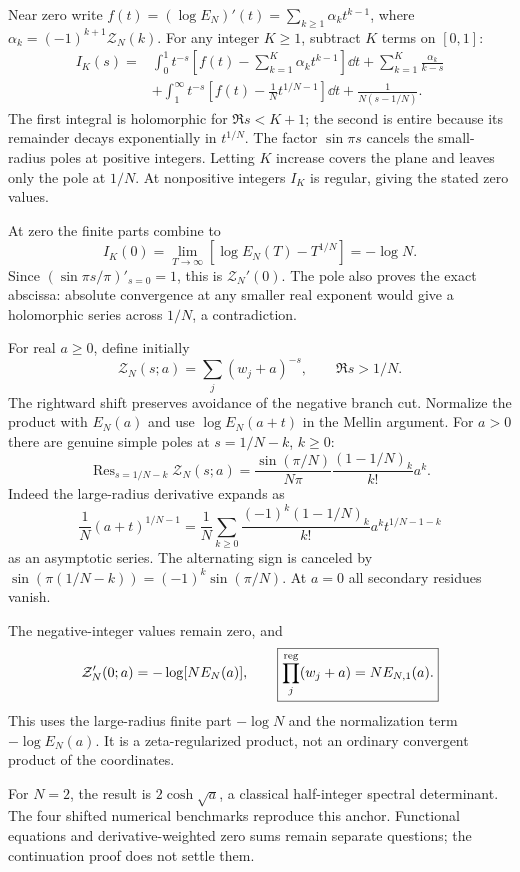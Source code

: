 Near zero write $f(t)=(\log E_N)'(t)=\sum_{k\ge1}\alpha_kt^{k-1}$,
where $\alpha_k=(-1)^{k+1}\mathcal Z_N(k)$.
For any integer $K\ge1$, subtract $K$ terms on $[0,1]$:
\[
\begin{aligned}
I_K(s)={}&\int_0^1t^{-s}\left[f(t)-\sum_{k=1}^K\alpha_kt^{k-1}\right]\dd t
+\sum_{k=1}^K\frac{\alpha_k}{k-s}\\
&+\int_1^\infty t^{-s}\left[f(t)-\frac1N t^{1/N-1}\right]\dd t
+\frac{1}{N(s-1/N)}.
\end{aligned}
\]
The first integral is holomorphic for $\Re s<K+1$; the second is entire
because its remainder decays exponentially in $t^{1/N}$.
The factor $\sin\pi s$ cancels the small-radius poles at positive integers.
Letting $K$ increase covers the plane and leaves only the pole at $1/N$.
At nonpositive integers $I_K$ is regular, giving the stated zero values.

At zero the finite parts combine to
\[
I_K(0)=\lim_{T\to\infty}[\log E_N(T)-T^{1/N}]=-\log N.
\]
Since $(\sin\pi s/\pi)'_{s=0}=1$, this is $\mathcal Z_N'(0)$.
The pole also proves the exact abscissa: absolute convergence at any smaller
real exponent would give a holomorphic series across $1/N$, a contradiction.

For real $a\ge0$, define initially
\[
\mathcal Z_N(s;a)=\sum_j(w_j+a)^{-s},\qquad\Re s>1/N.
\]
The rightward shift preserves avoidance of the negative branch cut.
Normalize the product with $E_N(a)$ and use
$\log E_N(a+t)$ in the Mellin argument.
For $a>0$ there are genuine simple poles at $s=1/N-k$, $k\ge0$:
\[
\boxed{\operatorname{Res}_{s=1/N-k}\mathcal Z_N(s;a)
=\frac{\sin(\pi/N)}{N\pi}\frac{(1-1/N)_k}{k!}a^k.}
\]
Indeed the large-radius derivative expands as
\[
\frac1N(a+t)^{1/N-1}
=\frac1N\sum_{k\ge0}\frac{(-1)^k(1-1/N)_k}{k!}a^kt^{1/N-1-k}
\]
as an asymptotic series. The alternating sign is canceled by
$\sin(\pi(1/N-k))=(-1)^k\sin(\pi/N)$.
At $a=0$ all secondary residues vanish.

The negative-integer values remain zero, and
\[
\mathcal Z_N'(0;a)=-\log[N E_N(a)],\qquad
\boxed{\prod_j^{\rm reg}(w_j+a)=N E_{N,1}(a).}
\]
This uses the large-radius finite part $-\log N$ and the normalization
term $-\log E_N(a)$. It is a zeta-regularized product, not an ordinary
convergent product of the coordinates.

For $N=2$, the result is $2\cosh\sqrt a$, a classical half-integer
spectral determinant. The four shifted numerical benchmarks reproduce this
anchor. Functional equations and derivative-weighted zero sums remain
separate questions; the continuation proof does not settle them.
